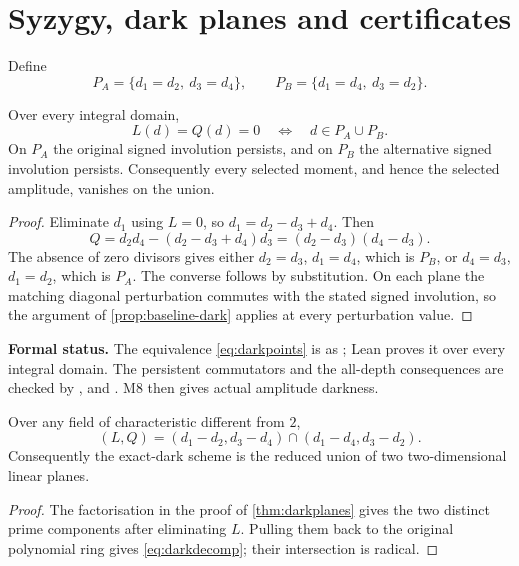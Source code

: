 \section{Syzygy, dark planes and certificates}\label{sec:dark}

Define
\[
P_A=\{d_1=d_2,\ d_3=d_4\},\qquad
P_B=\{d_1=d_4,\ d_3=d_2\}.
\]

\begin{theorem}\label{thm:darkplanes}
Over every integral domain,
\begin{equation}\label{eq:darkpoints}
L(d)=Q(d)=0\quad\Longleftrightarrow\quad d\in P_A\cup P_B.
\end{equation}
On $P_A$ the original signed involution persists, and on $P_B$ the
alternative signed involution persists.  Consequently every selected moment,
and hence the selected amplitude, vanishes on the union.
\end{theorem}
\begin{proof}
Eliminate $d_1$ using $L=0$, so $d_1=d_2-d_3+d_4$.  Then
\[
Q=d_2d_4-(d_2-d_3+d_4)d_3=(d_2-d_3)(d_4-d_3).
\]
The absence of zero divisors gives either
$d_2=d_3$, $d_1=d_4$, which is $P_B$, or
$d_4=d_3$, $d_1=d_2$, which is $P_A$.  The converse follows by
substitution.  On each plane the matching diagonal perturbation commutes with
the stated signed involution, so the argument of
\cref{prop:baseline-dark} applies at every perturbation value.
\end{proof}

\noindent\textbf{Formal status.}
The equivalence \cref{eq:darkpoints} is  as
; Lean proves it over every integral domain.
The persistent commutators and the all-depth consequences are checked by
,
 and
.  M8 then gives actual
amplitude darkness.

\begin{proposition}\label{prop:darkideal}
Over any field of characteristic different from $2$,
\begin{equation}\label{eq:darkdecomp}
(L,Q)=(d_1-d_2,d_3-d_4)\cap(d_1-d_4,d_3-d_2).
\end{equation}
Consequently the exact-dark scheme is the reduced union of two
two-dimensional linear planes.
\end{proposition}
\begin{proof}
The factorisation in the proof of \cref{thm:darkplanes} gives the two distinct
prime components after eliminating $L$.  Pulling them back to the original
polynomial ring gives \cref{eq:darkdecomp}; their intersection is radical.
\end{proof}

